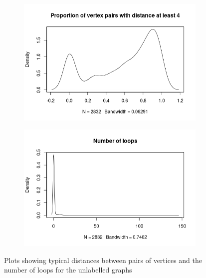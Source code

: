\documentclass{l4proj}
\theoremstyle{definition}
\theoremstyle{remark}
\begin{document}
\begin{figure}
\begin{subfigure}[t]{0.49\textwidth}
    \includegraphics[width=\textwidth]{images/sip_prop4.png}
  \end{subfigure}
  \begin{subfigure}[t]{0.49\textwidth}
    \centering
    \includegraphics[width=\textwidth]{images/sip_loops.png}
  \end{subfigure}
  \caption{Plots showing typical distances between pairs of vertices and the
    number of loops for the unlabelled graphs}
  \label{fig:sip_features2}
\end{figure}
\end{document}
